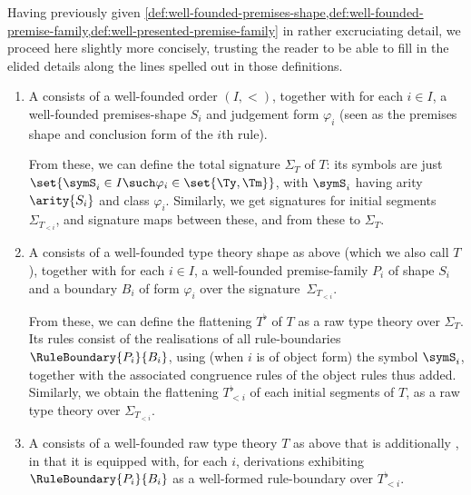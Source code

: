 Having previously given \cref{def:well-founded-premises-shape,def:well-founded-premise-family,def:well-presented-premise-family} in rather excruciating detail, we proceed here slightly more concisely, trusting the reader to be able to fill in the elided details along the lines spelled out in those definitions.

\begin{definition} \leavevmode
  \label{def:well-presented-type-theory}%
  \begin{enumerate}
  \item A  consists of a well-founded order $(I,<)$, together with for each $i \in I$, a well-founded premises-shape $S_i$ and judgement form $\varphi_i$ (seen as the premises shape and conclusion form of the $i$th rule).

    From these, we can define the total signature $\Sigma_T$ of $T$: its symbols are just $\set{ \symS_i \in I \such \varphi_i \in \set{\Ty,\Tm}}$, with $\symS_i$ having arity $\arity{S_i}$ and class $\varphi_i$.
    Similarly, we get signatures for initial segments $\Sigma_{T_{<i}}$, and signature maps between these, and from these to $\Sigma_T$.

  \item A  consists of a well-founded type theory shape as above (which we also call $T$), together with for each $i \in I$, a well-founded premise-family $P_i$ of shape $S_i$ and a boundary $B_i$ of form $\varphi_i$ over the signature~$\Sigma_{T_{<i}}$.

    From these, we can define the flattening $T^\flat$ of $T$ as a raw type theory over $\Sigma_T$.
    Its rules consist of the realisations of all rule-boundaries $\RuleBoundary{P_i}{B_i}$, using (when $i$ is of object form) the symbol $\symS_i$, together with the associated congruence rules of the object rules thus added.
    Similarly, we obtain the flattening $T_{<i}^\flat$ of each initial segments of $T$, as a raw type theory over $\Sigma_{T_{<i}}$.

  \item A  consists of a well-founded raw type theory $T$ as above that is additionally , in that it is equipped with, for each $i$, derivations exhibiting $\RuleBoundary{P_i}{B_i}$ as a well-formed rule-boundary over $T_{<i}^\flat$.
  \end{enumerate}
\end{definition}

